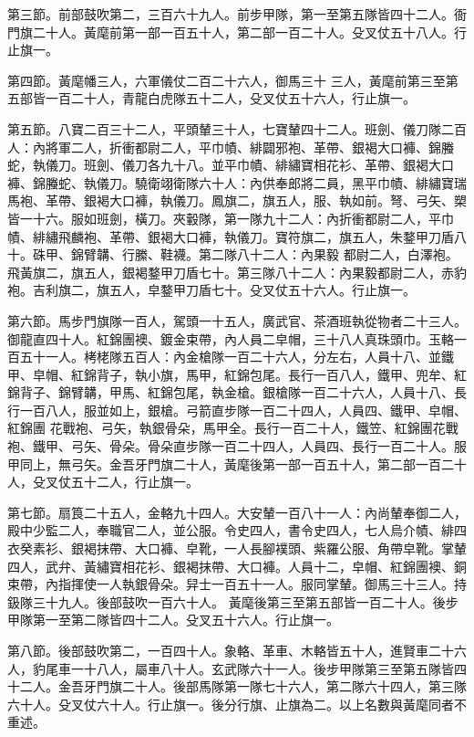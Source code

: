 \begin{pinyinscope}
 第三節。前部鼓吹第二，三百六十九人。前步甲隊，第一至第五隊皆四十二人。衙門旗二十人。黃麾前第一部一百五十人，第二部一百二十人。殳叉仗五十八人。行止旗一。



 第四節。黃麾幡三人，六軍儀仗二百二十六人，御馬三十
 三人，黃麾前第三至第五部皆一百二十人，青龍白虎隊五十二人，殳叉仗五十六人，行止旗一。



 第五節。八寶二百三十二人，平頭輦三十人，七寶輦四十二人。班劍、儀刀隊二百人：內將軍二人，折衝都尉二人，平巾幘、緋闢邪袍、革帶、銀褐大口褲、錦螣蛇，執儀刀。班劍、儀刀各九十八。並平巾幘、緋繡寶相花衫、革帶、銀褐大口褲、錦螣蛇、執儀刀。驍衛翊衛隊六十人：內供奉郎將二員，黑平巾幘、緋繡寶瑞馬袍、革帶、銀褐大口褲，執儀刀。鳳旗二，旗五人，服、執如前。弩、弓矢、槊皆一十六。服如班劍，橫刀。夾轂隊，第一隊九十二人：內折衝都尉二人，平巾幘、緋繡飛麟袍、革帶、銀褐大口褲，執儀刀。寶符旗二，旗五人，朱鍪甲刀盾八十。硃甲、錦臂韝、行縢、鞋襪。第二隊八十二人：內果毅
 都尉二人，白澤袍。飛黃旗二，旗五人，銀褐鍪甲刀盾七十。第三隊八十二人：內果毅都尉二人，赤豹袍。吉利旗二，旗五人，皁鍪甲刀盾七十。殳叉仗五十六人。行止旗一。



 第六節。馬步門旗隊一百人，駕頭一十五人，廣武官、茶酒班執從物者二十三人。御龍直四十人。紅錦團襖、鍍金束帶，內人員二皁帽，三十八人真珠頭巾。玉輅一百五十一人。栲栳隊五百人：內金槍隊一百二十六人，分左右，人員十八、並鐵甲、皁帽、紅錦背子，執小旗，馬甲，紅錦包尾。長行一百八人，鐵甲、兜牟、紅錦背子、錦臂韝，甲馬、紅錦包尾，執金槍。銀槍隊一百二十六人，人員十八、長行一百八人，服並如上，銀槍。弓箭直步隊一百二十四人，人員四、鐵甲、皁帽、紅錦團
 花戰袍、弓矢，執銀骨朵，馬甲全。長行一百二十人，鐵笠、紅錦團花戰袍、鐵甲、弓矢、骨朵。骨朵直步隊一百二十四人，人員四、長行一百二十人。服甲同上，無弓矢。金吾牙門旗二十人，黃麾後第一部一百五十人，第二部一百二十人，殳叉仗五十二人，行止旗一。



 第七節。扇筤二十五人，金輅九十四人。大安輦一百八十一人：內尚輦奉御二人，殿中少監二人，奉職官二人，並公服。令史四人，書令史四人，七人烏介幘、緋四衣癸素衫、銀褐抹帶、大口褲、皁靴，一人長腳襆頭、紫羅公服、角帶皁靴。掌輦四人，武弁、黃繡寶相花衫、銀褐抹帶、大口褲。人員十二，皁帽、紅錦團襖、銅束帶，內指揮使一人執銀骨朵。舁士一百五十一人。服同掌輦。御馬三十三人。持鈒隊三十九人。後部鼓吹一百六十人。
 黃麾後第三至第五部皆一百二十人。後步甲隊第一至第二隊皆四十二人。殳叉五十六人。行止旗一。



 第八節。後部鼓吹第二，一百四十人。象輅、革車、木輅皆五十人，進賢車二十六人，豹尾車一十八人，屬車八十人。玄武隊六十一人。後步甲隊第三至第五隊皆四十二人。金吾牙門旗二十人。後部馬隊第一隊七十六人，第二隊六十四人，第三隊六十人。殳叉仗六十人。行止旗一。後分行旗、止旗為二。以上名數與黃麾同者不重述。




\end{pinyinscope}
